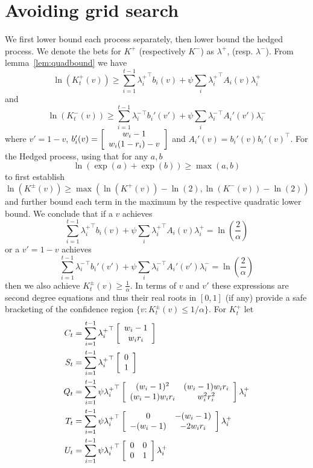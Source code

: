 



\newpage
\appendix
\section{Avoiding grid search}
\label{app:nogrid2d}
We first lower bound each process separately, then lower bound
the hedged process. We denote the bets for $K^{+}$ (respectively
$K^{-}$) as $\lambda^{+}$, (resp. $\lambda^{-}$).
From lemma~\ref{lem:quadbound} we have
\[
\ln(K_t^{+}(v)) \geq \sum_{i=1}^{t-1} {\lambda_i^{+}}^\top b_i(v) + \psi \sum_i {\lambda_i^{+}}^\top A_i(v) {\lambda_i^{+}}
\]
and
\[
\ln(K_t^{-}(v)) \geq \sum_{i=1}^{t-1} {\lambda_i^{-}}^\top b_i'(v') + \psi \sum_i {\lambda_i^{-}}^\top A_i'(v') {\lambda_i^{-}}
\]
where $v'=1-v$, 
$b_i'(v)=
\left[\begin{array}{c} w_i-1 \\ w_i (1-r_i) -v \end{array}\right]
$
and $A_i'(v)=b_i'(v)b_i'(v)^\top$.
For the Hedged process, using that for any $a,b$
\[
\ln\left(\exp(a)+\exp(b)\right)\geq \max(a,b)
\]
to first establish
\[
\ln(K^{\pm}(v)) \geq \max(\ln(K^{+}(v))-\ln(2),\ln(K^{-}(v))-\ln(2))
\]
and further bound each term in the maximum by the respective 
quadratic lower bound. We conclude that
if a $v$ achieves 
\[
 \sum_{i=1}^{t-1} {\lambda_i^{+}}^\top b_i(v) + \psi \sum_i {\lambda_i^{+}}^\top A_i(v) \lambda_i^{+} = \ln\left(\frac{2}{\alpha}\right)
\]
or a $v'=1-v$ achieves 
\[
\sum_{i=1}^{t-1} {\lambda_i^{-}}^\top b_i'(v') + \psi \sum_i {\lambda_i^{-}}^\top A_i'(v') \lambda_i^{-} = \ln\left(\frac{2}{\alpha}\right)
\]
then we also achieve $K_t^{\pm}(v) \geq \frac{1}{\alpha}$.
In terms of $v$ and $v'$ these expressions are second degree
equations and thus their real roots in $[0,1]$ (if any) provide 
a safe bracketing of the confidence region $\{v:K_t^{\pm}(v)\leq 1/\alpha\}$. For $K_t^{+}$ let
\begin{align}
C_t&= \sum_{i=1}^{t-1} {\lambda_i^{+}}^\top \left[\begin{array}{c} w_i-1 \\ w_i r_i \end{array}\right] \label{eq:upsuffc}\\
S_t&= \sum_{i=1}^{t-1} {\lambda_i^{+}}^\top \left[\begin{array}{c} 0 \\ 1 \end{array}\right] \\
Q_t&= \sum_{i=1}^{t-1} \psi  {\lambda_i^{+}}^\top \left[\begin{array}{cc} (w_i-1)^2 & (w_i-1)w_i r_i \\ (w_i-1)w_i r_i & w_i^2r_i^2 \end{array}\right] \lambda_i^{+} \\
T_t&= \sum_{i=1}^{t-1} \psi  {\lambda_i^{+}}^\top \left[\begin{array}{cc} 0 & -(w_i-1) \\ -(w_i-1) & -2w_ir_i \end{array}\right] \lambda_i^{+} \\
U_t&=  \sum_{i=1}^{t-1} \psi {\lambda_i^{+}}^\top \left[\begin{array}{cc} 0 & 0 \\ 0 & 1 \end{array}\right] \lambda_i^{+} \label{eq:upsuffu}
\end{align}
